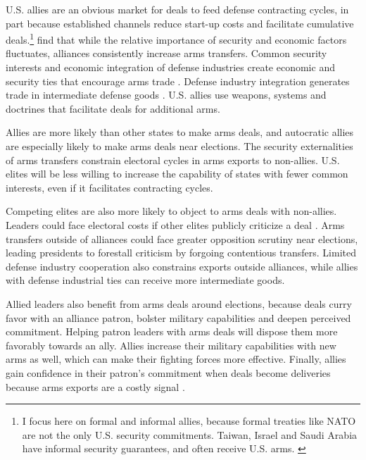 \documentclass[12pt]{article}
\begin{document}
U.S. allies are an obvious market for deals to feed defense contracting cycles, in part because established channels reduce start-up costs and facilitate cumulative deals.\footnote{I focus here on formal and informal allies, because formal treaties like NATO are not the only U.S. security commitments. Taiwan, Israel and Saudi Arabia have informal security guarantees, and often receive U.S. arms. \citep{Yarhi-Miloetal2016}}
\citet{Thurneretal2019} find that while the relative importance of security and economic factors fluctuates, alliances consistently increase arms transfers.
Common security interests and economic integration of defense industries create economic and security ties that encourage arms trade \citep{Bitzinger1994}. 
Defense industry integration generates trade in intermediate defense goods \citep{Brooks2005}. 
U.S. allies use weapons, systems and doctrines that facilitate deals for additional arms. 


Allies are more likely than other states to make arms deals, and autocratic allies are especially likely to make arms deals near elections. 
The security externalities of arms transfers constrain electoral cycles in arms exports to non-allies. 
U.S. elites will be less willing to increase the capability of states with fewer common interests, even if it facilitates contracting cycles.


Competing elites are also more likely to object to arms deals with non-allies.
Leaders could face electoral costs if other elites publicly criticize a deal \citep{Saunders2022}.
Arms transfers outside of alliances could face greater opposition scrutiny near elections, leading presidents to forestall criticism by forgoing contentious transfers.
Limited defense industry cooperation also constrains exports outside alliances, while allies with defense industrial ties can receive more intermediate goods.


Allied leaders also benefit from arms deals around elections, because deals curry favor with an alliance patron, bolster military capabilities and deepen perceived commitment.
Helping patron leaders with arms deals will dispose them more favorably towards an ally. 
Allies increase their military capabilities with new arms as well, which can make their fighting forces more effective. 
Finally, allies gain confidence in their patron's commitment when deals become deliveries because arms exports are a costly signal \citep{McManusYarhi-Milo2017}.
\end{document}
